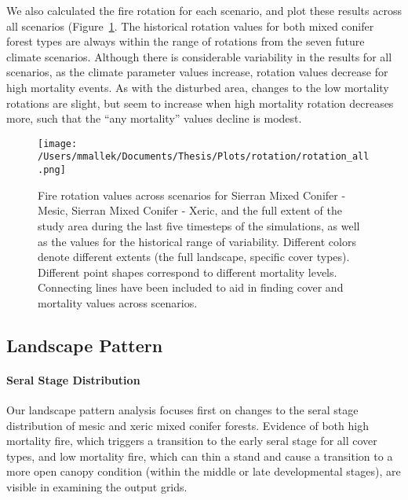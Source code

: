 We also calculated the fire rotation for each scenario, and plot these results across all scenarios (Figure~\ref{fig:frotation}. The historical rotation values for both mixed conifer forest types are always within the range of rotations from the seven future climate scenarios. Although there is considerable variability in the results for all scenarios, as the climate parameter values increase, rotation values decrease for high mortality events. As with the disturbed area, changes to the low mortality rotations are slight, but seem to increase when high mortality rotation decreases more, such that the ``any mortality'' values decline is modest.



\begin{figure}
\centering
\texttt{[image: /Users/mmallek/Documents/Thesis/Plots/rotation/rotation\_all.png]}
\caption{Fire rotation values across scenarios for Sierran Mixed Conifer - Mesic, Sierran Mixed Conifer - Xeric, and the full extent of the study area during the last five timesteps of the simulations, as well as the values for the historical range of variability. Different colors denote different extents (the full landscape, specific cover types). Different point shapes correspond to different mortality levels. Connecting lines have been included to aid in finding cover and mortality values across scenarios.}
\label{fig:frotation}
\end{figure}



\subsection*{Landscape Pattern}

\paragraph{Seral Stage Distribution}
Our landscape pattern analysis focuses first on changes to the seral stage distribution of mesic and xeric mixed conifer forests. Evidence of both high mortality fire, which triggers a transition to the early seral stage for all cover types, and low mortality fire, which can thin a stand and cause a transition to a more open canopy condition (within the middle or late developmental stages), are visible in examining the output grids.


